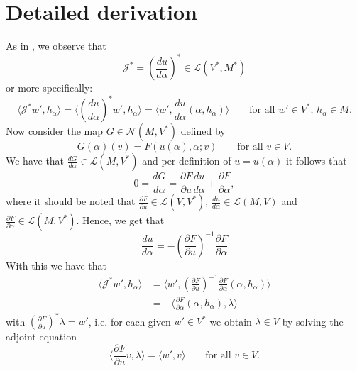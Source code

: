 \documentclass[11pt]{article}
\begin{document}
\section{Detailed derivation}
As in \cite{bouziani2023physics}, we observe that
\begin{equation}
    \mathcal{J}^* = \left(\frac{du}{d\alpha}\right)^* \in \mathcal{L}(V^*,M^*)
\end{equation}
or more specifically:
\begin{equation}
    \langle\mathcal{J}^*w',h_\alpha \rangle  = \langle \left(\frac{du}{d\alpha}\right)^* w',h_\alpha \rangle = \langle w',\frac{du}{d\alpha}(\alpha,h_\alpha) \rangle \qquad\text{for all $w'\in V^*$, $h_\alpha\in M$}.
\end{equation}
Now consider the map $G\in\mathcal{N}(M,V^*)$ defined by
\begin{equation}
    G(\alpha)(v) = F(u(\alpha),\alpha;v) \qquad\text{for all $v\in V$.}
\end{equation} 
We have that $\frac{dG}{d\alpha}\in \mathcal{L}(M,V^*)$ and per definition of $u=u(\alpha)$ it follows that
\begin{equation}
     0 = \frac{dG}{d\alpha} = \frac{\partial F}{\partial u}\frac{du}{d\alpha} + \frac{\partial F}{\partial \alpha},
\end{equation}
where it should be noted that $\frac{\partial F}{\partial u}\in \mathcal{L}(V,V^*)$, $\frac{du}{d\alpha}\in \mathcal{L}(M,V)$ and $\frac{\partial F}{\partial \alpha}\in \mathcal{L}(M,V^*)$. Hence, we get that
\begin{equation}
    \frac{du}{d\alpha} = - \left(\frac{\partial F}{\partial u}\right)^{-1}\frac{\partial F}{\partial\alpha}
\end{equation}
With this we have that 
\begin{equation}
    \begin{aligned}
    \langle\mathcal{J}^*w',h_\alpha \rangle &= \langle w',\left(\frac{\partial F}{\partial u}\right)^{-1}\frac{\partial F}{\partial\alpha}(\alpha,h_\alpha)\rangle\\
    &= -\langle \frac{\partial F}{\partial\alpha}(\alpha,h_\alpha), \lambda\rangle
    \end{aligned}
\end{equation}
with $\left(\frac{\partial F}{\partial u}\right)^* \lambda = w'$, i.e. for each given $w'\in V^*$ we obtain $\lambda\in V$ by solving the adjoint equation
\begin{equation}
\langle \frac{\partial F}{\partial u}v,\lambda\rangle = \langle w',v\rangle \qquad\text{for all $v\in V$}.
\end{equation}
\end{document}
